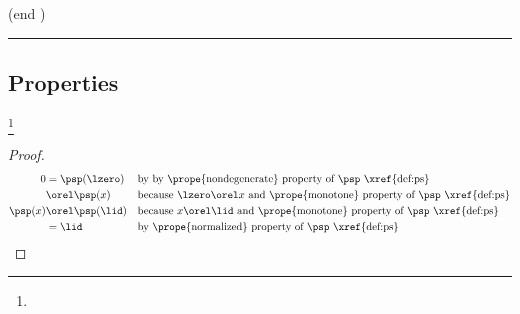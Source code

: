 (end )
\hrule

\subsection{Properties}
\begin{proposition}
\footnote{
  }
\label{prop:ps_01}
\end{proposition}
\begin{proof}
  \begin{align*}
    0
      &= \psp(\lzero)
      && \text{by by \prope{nondegenerate} property of $\psp$ \xref{def:ps}}
    \\&\orel \psp(x)
      && \text{because $\lzero\orel x$ and \prope{monotone} property of $\psp$ \xref{def:ps}}
    \\
    \psp(x)
      &\orel \psp(\lid)
      && \text{because $x\orel\lid$ and \prope{monotone} property of $\psp$ \xref{def:ps}}
    \\&= \lid
      && \text{by \prope{normalized} property of $\psp$ \xref{def:ps}}
  \end{align*}
\end{proof}

